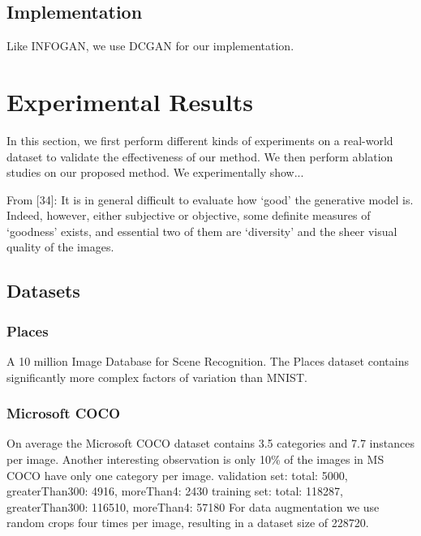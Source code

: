 \documentclass[12pt,a4paper]{article}
\begin{document}
\subsection{Implementation}
Like INFOGAN, we use DCGAN for our implementation.

\section{Experimental Results}
In this section, we first perform different kinds of experiments on a real-world dataset to validate the
effectiveness of our method. We then perform ablation studies on our proposed
method. 
We experimentally show...

From [34]: It is in general difficult to evaluate how ‘good’ the generative model is. Indeed, however, either subjective or objective, some definite measures of ‘goodness’ exists, and essential two of them are ‘diversity’ and the sheer visual quality of the images.
    
\subsection{Datasets}
\subsubsection{Places}
A 10 million Image Database for Scene Recognition. The Places dataset contains significantly more complex factors of variation than MNIST.

\subsubsection{Microsoft COCO}
On average the Microsoft COCO dataset \cite{1405.0312} contains 3.5 categories and 7.7 instances per image. Another interesting observation is only 10\% of the images in MS COCO have only one category per image.
validation set: total: 5000, greaterThan300: 4916, moreThan4: 2430
training set: total: 118287, greaterThan300: 116510, moreThan4: 57180
For data augmentation we use random crops four times per image, resulting in a dataset size of 228720.
    
\end{document}
